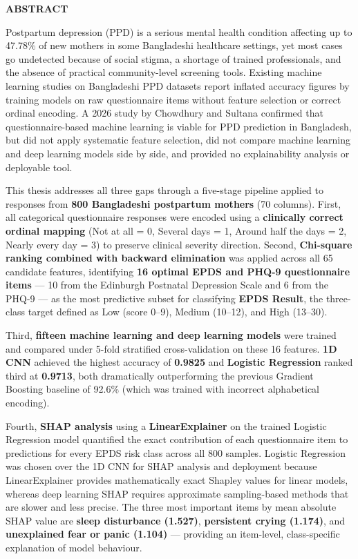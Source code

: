 \thispagestyle{plain}
\begin{center}
    \Large \textbf{\uppercase{Abstract}}
\end{center}
\vspace{3\baselineskip}
\noindent
Postpartum depression (PPD) is a serious mental health condition affecting up to 47.78\% of new mothers in some Bangladeshi healthcare settings, yet most cases go undetected because of social stigma, a shortage of trained professionals, and the absence of practical community-level screening tools.
Existing machine learning studies on Bangladeshi PPD datasets report inflated accuracy figures by training models on raw questionnaire items without feature selection or correct ordinal encoding.
A 2026 study by Chowdhury and Sultana confirmed that questionnaire-based machine learning is viable for PPD prediction in Bangladesh, but did not apply systematic feature selection, did not compare machine learning and deep learning models side by side, and provided no explainability analysis or deployable tool.

This thesis addresses all three gaps through a five-stage pipeline applied to responses from \textbf{800 Bangladeshi postpartum mothers} (70 columns).
First, all categorical questionnaire responses were encoded using a \textbf{clinically correct ordinal mapping} (Not at all = 0, Several days = 1, Around half the days = 2, Nearly every day = 3) to preserve clinical severity direction.
Second, \textbf{Chi-square ranking combined with backward elimination} was applied across all 65 candidate features, identifying \textbf{16 optimal EPDS and PHQ-9 questionnaire items} --- 10 from the Edinburgh Postnatal Depression Scale and 6 from the PHQ-9 --- as the most predictive subset for classifying \textbf{EPDS Result}, the three-class target defined as Low (score 0--9), Medium (10--12), and High (13--30).

Third, \textbf{fifteen machine learning and deep learning models} were trained and compared under 5-fold stratified cross-validation on these 16 features.
\textbf{1D CNN} achieved the highest accuracy of \textbf{0.9825} and \textbf{Logistic Regression} ranked third at \textbf{0.9713}, both dramatically outperforming the previous Gradient Boosting baseline of 92.6\% (which was trained with incorrect alphabetical encoding).

Fourth, \textbf{SHAP analysis} using a \textbf{LinearExplainer} on the trained Logistic Regression model quantified the exact contribution of each questionnaire item to predictions for every EPDS risk class across all 800 samples.
Logistic Regression was chosen over the 1D CNN for SHAP analysis and deployment because LinearExplainer provides mathematically exact Shapley values for linear models, whereas deep learning SHAP requires approximate sampling-based methods that are slower and less precise.
The three most important items by mean absolute SHAP value are \textbf{sleep disturbance (1.527)}, \textbf{persistent crying (1.174)}, and \textbf{unexplained fear or panic (1.104)} --- providing an item-level, class-specific explanation of model behaviour.

